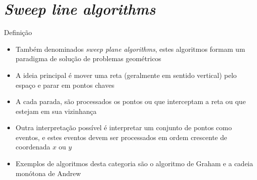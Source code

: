 \section{\it Sweep line algorithms}

\begin{frame}[fragile]{Definição}

    \begin{itemize}
        \item Também denominados \textit{sweep plane algorithms}, estes algoritmos formam
            um paradigma de solução de problemas geométricos
        \pause

        \item A ideia principal é mover uma reta (geralmente em sentido vertical) pelo espaço e
            parar em pontos chaves
        \pause

        \item A cada parada, são processados os pontos ou que interceptam a reta ou que estejam
            em sua vizinhança
        \pause

        \item Outra interpretação possível é interpretar um conjunto de pontos como eventos, e
            estes eventos devem ser processados em ordem crescente de coordenada $x$ ou $y$
        \pause

        \item Exemplos de algoritmos desta categoria são o algoritmo de Graham e a cadeia monótona
            de Andrew
   \end{itemize}

\end{frame}
